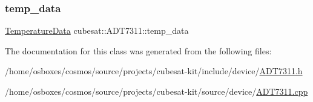 \mbox{\label{classcubesat_1_1ADT7311_a8045af6862135c6796ea97b95e431705}} 
\subsubsection{\texorpdfstring{temp\+\_\+data}{temp\_data}}
{\footnotesize\ttfamily \hyperlink{unioncubesat_1_1ADT7311_1_1TemperatureData}{Temperature\+Data} cubesat\+::\+A\+D\+T7311\+::temp\+\_\+data\hspace{0.3cm}{\ttfamily [private]}}



The documentation for this class was generated from the following files\+:\begin{DoxyCompactItemize}
\item 
/home/osboxes/cosmos/source/projects/cubesat-\/kit/include/device/\hyperlink{ADT7311_8h}{A\+D\+T7311.\+h}\item 
/home/osboxes/cosmos/source/projects/cubesat-\/kit/source/device/\hyperlink{ADT7311_8cpp}{A\+D\+T7311.\+cpp}\end{DoxyCompactItemize}
